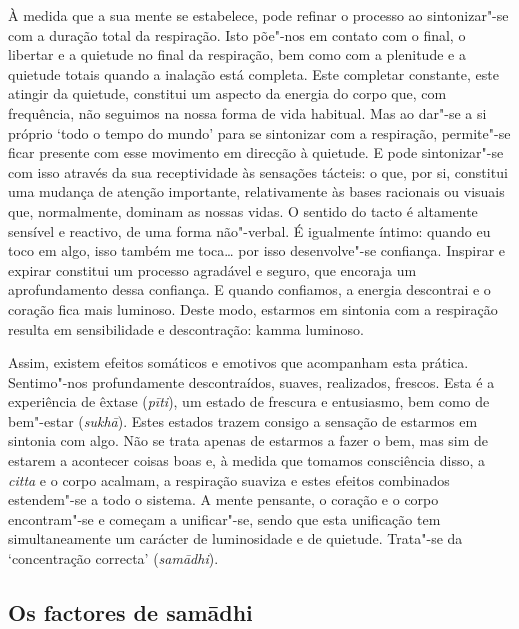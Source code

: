 À medida que a sua mente se estabelece, pode refinar o processo ao sintonizar"-se
com a duração total da respiração. Isto põe"-nos em contato com o final, o
libertar e a quietude no final da respiração, bem como com a plenitude e a
quietude totais quando a inalação está completa. Este completar constante, este
atingir da quietude, constitui um aspecto da energia do corpo que, com
frequência, não seguimos na nossa forma de vida habitual. Mas ao dar"-se a si
próprio `todo o tempo do mundo' para se sintonizar com a respiração, permite"-se
ficar presente com esse movimento em direcção à quietude. E pode sintonizar"-se
com isso através da sua receptividade às sensações tácteis: o que, por si,
constitui uma mudança de atenção importante, relativamente às bases racionais ou
visuais que, normalmente, dominam as nossas vidas. O sentido do tacto é
altamente sensível e reactivo, de uma forma não"-verbal. É igualmente íntimo:
quando eu toco em algo, isso também me toca\ldots{} por isso desenvolve"-se confiança.
Inspirar e expirar constitui um processo agradável e seguro, que encoraja um
aprofundamento dessa confiança. E quando confiamos, a energia descontrai e o
coração fica mais luminoso. Deste modo, estarmos em sintonia com a respiração
resulta em sensibilidade e descontração: kamma luminoso.

\enlargethispage{\baselineskip}

Assim, existem efeitos somáticos e emotivos que acompanham esta prática.
Sentimo"-nos profundamente descontraídos, suaves, realizados, frescos. Esta é a
experiência de êxtase (\emph{pīti}), um estado de frescura e entusiasmo, bem
como de bem"-estar (\emph{sukhā}). Estes estados trazem consigo a sensação de
estarmos em sintonia com algo. Não se trata apenas de estarmos a fazer o bem,
mas sim de estarem a acontecer coisas boas e, à medida que tomamos consciência
disso, a \emph{citta} e o corpo acalmam, a respiração suaviza e estes efeitos
combinados estendem"-se a todo o sistema. A mente pensante, o coração e o corpo
encontram"-se e começam a unificar"-se, sendo que esta unificação tem
simultaneamente um carácter de luminosidade e de quietude. Trata"-se da
`concentração correcta' (\emph{samādhi}).

\subsection{Os factores de samādhi}

